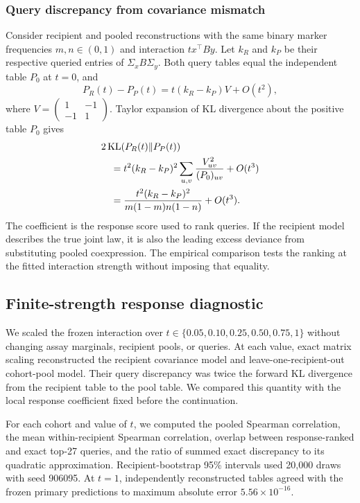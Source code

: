 \subsubsection{Query discrepancy from covariance mismatch}\label{app:query}
Consider recipient and pooled reconstructions with the same binary marker
frequencies $m,n\in(0,1)$ and interaction $t x^\top B y$. Let $k_R$ and $k_P$
be their respective queried entries of $\Sigma_x B\Sigma_y$. Both query tables
equal the independent table $P_0$ at $t=0$, and
\[
 P_R(t)-P_P(t)=t(k_R-k_P)V+O(t^2),
\]
where $V=\left(\begin{smallmatrix}1&-1\\-1&1\end{smallmatrix}\right)$.
Taylor expansion of KL divergence about the positive table $P_0$ gives
\begin{align*}
 &2\operatorname{KL}(P_R(t)\Vert P_P(t))\\*
 &\quad=t^2(k_R-k_P)^2\sum_{u,v}\frac{V_{uv}^2}{(P_0)_{uv}}+O(t^3)\\*
 &\quad=\frac{t^2(k_R-k_P)^2}{m(1-m)n(1-n)}+O(t^3).
\end{align*}
The coefficient is the response score used to rank queries. If the recipient
model describes the true joint law, it is also the leading excess deviance
from substituting pooled coexpression. The empirical comparison tests the
ranking at the fitted interaction strength without imposing that equality.



\subsection{Finite-strength response diagnostic}
We scaled the frozen interaction over
$t\in\{0.05,0.10,0.25,0.50,0.75,1\}$ without changing assay marginals,
recipient pools, or queries. At each value, exact matrix scaling reconstructed
the recipient covariance model and leave-one-recipient-out cohort-pool model.
Their query discrepancy was twice the forward KL divergence from the recipient
table to the pool table. We compared this quantity with the local response
coefficient fixed before the continuation.

For each cohort and value of $t$, we computed the pooled Spearman correlation,
the mean within-recipient Spearman correlation, overlap between response-ranked
and exact top-27 queries, and the ratio of summed exact discrepancy to its
quadratic approximation. Recipient-bootstrap 95\% intervals used 20,000 draws
with seed 906095. At $t=1$, independently reconstructed tables agreed with the
frozen primary predictions to maximum absolute error
$5.56\times10^{-16}$.

